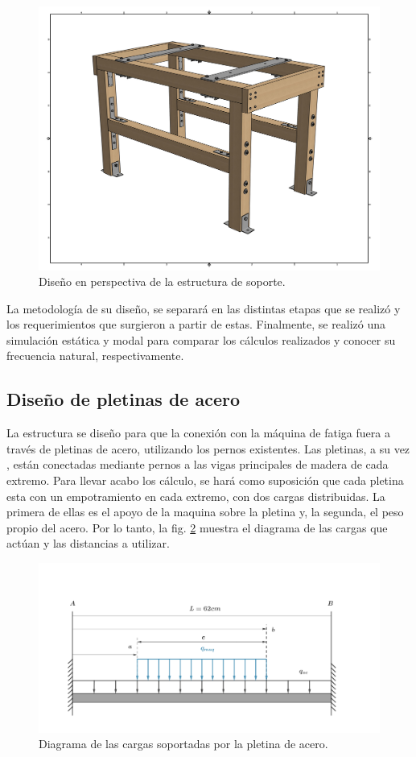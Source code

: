 \begin{figure}[h]
\centering
\includegraphics[width=0.9\linewidth, trim={5cm 3cm 5cm 3cm},clip]{Imagenes/mesa_persp.pdf}
\caption{Diseño en perspectiva de la estructura de soporte.}
\label{fig:mesa_persp}
\end{figure}

La metodología de su diseño, se separará en las distintas etapas que se realizó y los requerimientos que surgieron a partir de estas. Finalmente, se realizó una simulación estática y modal para comparar los cálculos realizados y conocer su frecuencia natural, respectivamente.
\subsection{Diseño de pletinas de acero}
La estructura se diseño para que la conexión con la máquina de fatiga fuera a través de pletinas de acero, utilizando los pernos existentes. Las pletinas, a su vez , están conectadas mediante pernos a las vigas principales de madera de cada extremo. Para llevar acabo los cálculo, se hará como suposición que cada pletina esta con un empotramiento en cada extremo, con dos cargas distribuidas. La primera de ellas es el apoyo de la maquina sobre la pletina y, la segunda, el peso propio del acero. Por lo tanto, la fig. \ref{fig:diagcargas_viga_acero} muestra el diagrama de las cargas que actúan y las distancias a utilizar. 

\begin{figure}[h]
\centering
\includegraphics[width=1\linewidth,trim={2cm 1cm 4cm 5cm},clip]{Imagenes/dia_viga_acero.pdf}
\caption{Diagrama de las cargas soportadas por la pletina de acero.}
\label{fig:diagcargas_viga_acero}
\end{figure}

